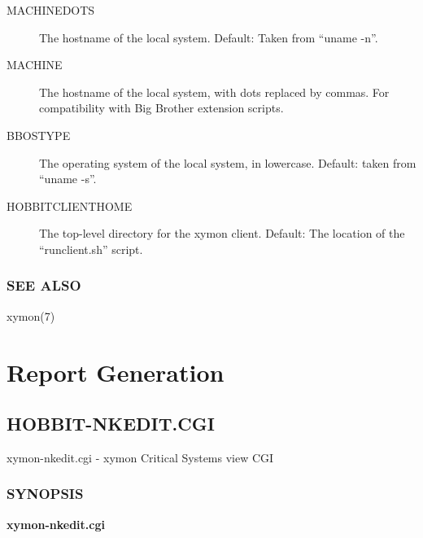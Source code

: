  \begin{description}
\item[MACHINEDOTS] The hostname of the local system. Default: Taken from ``uname -n''. 

 

\item[MACHINE] The hostname of the local system, with dots replaced by
  commas. For compatibility with Big Brother extension scripts. 


 

\item[BBOSTYPE] The operating system of the local system, in lowercase. Default: taken from ``uname -s''. 

 

\item[HOBBITCLIENTHOME] The top-level directory for the xymon
  client. Default: The location of the ``runclient.sh'' script. 



\end{description}

\subsection{SEE ALSO}
xymon(7) 
 


%
\chapter{Report Generation}

%

\newpage
\section{HOBBIT-NKEDIT.CGI}

 xymon-nkedit.cgi - xymon Critical Systems view CGI 

\subsection{SYNOPSIS}
\textbf{xymon-nkedit.cgi}



